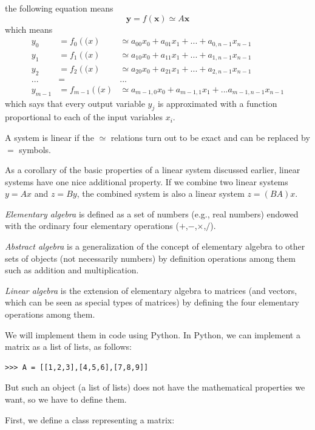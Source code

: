\documentclass[justified,sixbynine]{tufte-book}
\theoremstyle{plain}%
\theoremstyle{definition}
\theoremstyle{remark}
\begin{document}
\begin{fullwidth}
the following equation means
\begin{equation}
\mathbf{y} = f(\mathbf{x}) \simeq A \mathbf{x}
\end{equation}
which means
\begin{eqnarray}
y_0 &= f_0(\mathbf(x) &\simeq a_{00} x_0 + a_{01} x_1 + ... + a_{0,n-1}x_{n-1} \\
y_1 &= f_1(\mathbf(x) &\simeq a_{10} x_0 + a_{11} x_1 + ... + a_{1,n-1}x_{n-1} \\
y_2 &= f_2(\mathbf(x) &\simeq a_{20} x_0 + a_{21} x_1 + ... + a_{2,n-1}x_{n-1} \\
... &=& ... \\
y_{m-1} &= f_{m-1}(\mathbf(x) &\simeq a_{m-1,0} x_0 + a_{m-1,1} x_1 + ...
a_{m-1,n-1}x_{n-1}
\end{eqnarray}
which says that every output variable $y_j$ is approximated with a function proportional to each of the input variables $x_i$.

A system is linear if the $\simeq$ relations turn out to be exact and can be replaced by $=$ symbols.

As a corollary of the basic properties of a linear system discussed earlier, linear systems have one nice additional property. If we combine two linear systems $y=Ax$ and $z=By$, the combined system is also a linear system $z = (BA)x$.


{\it Elementary algebra} is defined as a set of numbers (e.g., real numbers) endowed with the ordinary four elementary operations ($+$,$-$,$\times$,$/$).

{\it Abstract algebra} is a generalization of the concept of elementary algebra to other sets of objects (not necessarily numbers) by definition operations among them such as addition and multiplication.

{\it Linear algebra} is the extension of elementary algebra to matrices (and vectors, which can be seen as special types of matrices) by defining the four elementary operations among them.

We will implement them in code using Python.
In Python, we can implement a matrix as a list of lists, as follows:
\begin{lstlisting}
>>> A = [[1,2,3],[4,5,6],[7,8,9]]
\end{lstlisting}
But such an object (a list of lists) does not have the mathematical properties we want, so we have to define them.

First, we define a class representing a matrix:


\end{fullwidth}
\end{document}

